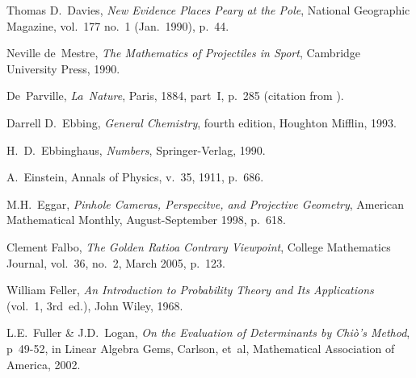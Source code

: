 \begin{thebibliography}{\makebox[2em][c]{{}\hfil{}}}
  Thomas D.~Davies,
  \emph{New Evidence Places Peary at the Pole},
  National Geographic Magazine,
  vol.~177 no.~1 (Jan.~1990),
  p.~44.

  Neville de~Mestre,
  \emph{The Mathematics of Projectiles in Sport},
  Cambridge University Press,
  1990.

 De~Parville,
 \emph{La~Nature},
 Paris, 1884,
 part~I,
 p.~285
 (citation from \cite{Ball}).



  Darrell D.~Ebbing,
  \emph{General Chemistry},
  fourth edition,
  Houghton Mifflin,
  1993.

  H.\ D.\ Ebbinghaus,
  \emph{Numbers},
  Springer-Verlag,
  1990.

  A.~Einstein,
  Annals of Physics,
  v.~35, 1911,
  p.~686.

  M.H.~Eggar,
  \emph{Pinhole Cameras, Perspecitve, and Projective Geometry},
  American Mathematical Monthly,
  August-September 1998,
  p.~618.

  Clement Falbo,
  \emph{The Golden Ratio\Dash a Contrary Viewpoint},
  College Mathematics Journal,
  vol.~36, no.~2, March 2005,
  p.~123.

  William Feller,
  \emph{An Introduction to Probability Theory and Its Applications}
  (vol.~1, 3rd~ed.),
  John Wiley, 1968.



  L.E.~Fuller \& J.D.~Logan,
  \emph{On the Evaluation of Determinants by Chi\`o's Method},
  p~49-52, in Linear Algebra Gems,
  Carlson, et~al,
  Mathematical Association of America,  
  2002.


\end{thebibliography}
